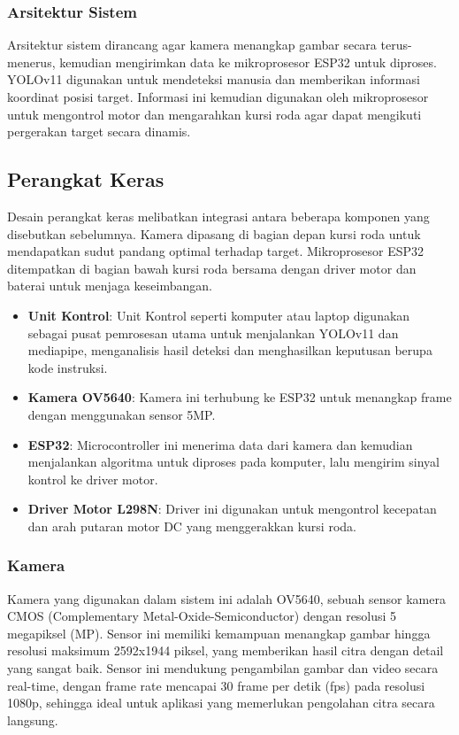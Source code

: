 \subsubsection{Arsitektur Sistem}
\label{subsubsec:arsitektursistem}

Arsitektur sistem dirancang agar kamera menangkap gambar secara terus-menerus, kemudian mengirimkan data ke mikroprosesor ESP32 untuk diproses. YOLOv11 digunakan untuk mendeteksi manusia dan memberikan informasi koordinat posisi target. Informasi ini kemudian digunakan oleh mikroprosesor untuk mengontrol motor dan mengarahkan kursi roda agar dapat mengikuti pergerakan target secara dinamis.

\subsection{Perangkat Keras}
\label{subsec:perangkathardware}

Desain perangkat keras melibatkan integrasi antara beberapa komponen yang disebutkan sebelumnya. Kamera dipasang di bagian depan kursi roda untuk mendapatkan sudut pandang optimal terhadap target. Mikroprosesor ESP32 ditempatkan di bagian bawah kursi roda bersama dengan driver motor dan baterai untuk menjaga keseimbangan.

\begin{itemize}
    \item \textbf{Unit Kontrol}: Unit Kontrol seperti komputer atau laptop digunakan sebagai pusat pemrosesan utama untuk menjalankan YOLOv11 dan mediapipe, menganalisis hasil deteksi dan menghasilkan keputusan berupa kode instruksi.
    \item \textbf{Kamera OV5640}: Kamera ini terhubung ke ESP32 untuk menangkap frame dengan menggunakan sensor 5MP.
    \item \textbf{ESP32}: Microcontroller ini menerima data dari kamera dan kemudian menjalankan algoritma untuk diproses pada komputer, lalu mengirim sinyal kontrol ke driver motor.
    \item \textbf{Driver Motor L298N}: Driver ini digunakan untuk mengontrol kecepatan dan arah putaran motor DC yang menggerakkan kursi roda.
\end{itemize}

\subsubsection{Kamera}
\label{subsubsec:kamera}
Kamera yang digunakan dalam sistem ini adalah OV5640, sebuah sensor kamera CMOS (Complementary Metal-Oxide-Semiconductor) dengan resolusi 5 megapiksel (MP). Sensor ini memiliki kemampuan menangkap gambar hingga resolusi maksimum 2592x1944 piksel, yang memberikan hasil citra dengan detail yang sangat baik. Sensor ini mendukung pengambilan gambar dan video secara real-time, dengan frame rate mencapai 30 frame per detik (fps) pada resolusi 1080p, sehingga ideal untuk aplikasi yang memerlukan pengolahan citra secara langsung.

